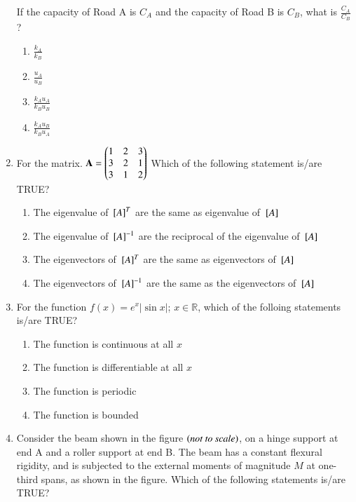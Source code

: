 \documentclass[journal,12pt,onecolumn]{IEEEtran}
\theoremstyle{remark}
\begin{document}
\begin{enumerate}
If the capacity of Road A is $C_A$ and the capacity of Road B is $C_B$, what is $\frac{C_A}{C_B}$?

\hfill{}
\begin{enumerate}
\item $\frac{k_A}{k_B}$
\item $\frac{u_A}{u_B}$
\item $\frac{k_Au_A}{k_Bu_B}$
\item $\frac{k_Au_B}{k_Bu_A}$
\end{enumerate}

\item For the matrix.
$\mathbf{A} = \begin{pmatrix}1 & 2 & 3 \\
3 & 2 & 1 \\
3 & 1 & 2
\end{pmatrix}$
Which of the following statement is/are TRUE?

\hfill{}
\begin{enumerate}
\item The eigenvalue of ${}\left[A\right]^T$ are the same as eigenvalue of  ${}\left[A\right]$
\item The eigenvalue of ${}\left[A\right]^{-1}$ are the reciprocal of the eigenvalue of  ${}\left[A\right]$
\item The eigenvectors of ${}\left[A\right]^T$ are the same as eigenvectors of  ${}\left[A\right]$
\item The eigenvectors of ${}\left[A\right]^{-1}$ are the same as the eigenvectors of  ${}\left[A\right]$
\end{enumerate}

\item For the function $f(x)=e^x|\sin{x}|$; $x\in\mathbb{R}$, which of the folloing statements is/are TRUE?

\hfill{}
\begin{enumerate}
\item The function is continuous at all $x$
\item The function is differentiable at all $x$
\item The function is periodic
\item The function is bounded
\end{enumerate}

\item Consider the beam shown in the figure $\left(\textit{not to scale}\right)$, on a hinge support at end A and a roller support at end B. The beam has a constant flexural rigidity, and is subjected to the external moments of magnitude $M$ at one-third spans, as shown in the figure. Which of the following statements is/are TRUE?


\end{enumerate}
\end{document}
